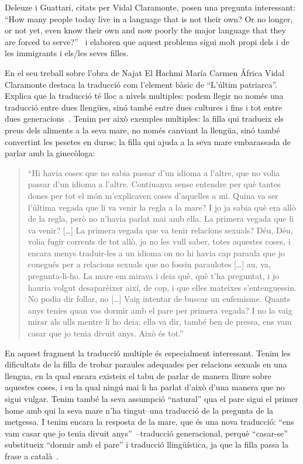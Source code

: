 Deleuze i Guattari, citats per Vidal Claramonte, posen una pregunta interessant:
``How many people today live in a language that is not their own? Or no longer, or not yet, even know their own and now poorly the major language that they are forced to serve?''~\autocite{Vidal2012}
i elaboren que aquest problema sigui molt propi dels i de les immigrants i els/les seves filles.

En el seu treball sobre l'obra de Najat El Hachmi María Carmen África Vidal Claramonte destaca la traducció com l'element bàsic de ``L'últim patriarca''.
Explica que la traducció té lloc a nivels multiples: podem llegir no només una traducció entre dues llengües, sinó també entre dues cultures i fins i tot entre dues generacions~\autocite{Vidal2012}.
Tenim per això exemples multiples:
la filla qui tradueix els preus dels aliments a la seva mare, no només canviant la llengüa, sinó també convertint les pesetes en duros;
la filla qui ajuda a la seva mare embarassada de parlar amb la ginecòloga:
\begin{quote}
``Hi havia coses que no sabia passar d'un idioma a l'altre, que no volia passar d'un idioma a l'altre. Contiuanva sense entendre per què tantes dones per tot el món m'explicaven coses d'aquelles a mi. Quina va ser l'última vegada que li va venir la regla a la mare? I jo ja sabia què era allò de la regla, però no n'havia parlat mai amb ella. La primera vegada que li va venir? [\ldots] La primera vegada que va tenir relacions sexuals? Déu, Déu, volia fugir corrents de tot allò, jo no les vull saber, totes aquestes coses, i encara menys traduir-les a un idioma on no hi havia cap paraula que jo conegués per a relacions sexuals que no fossin paraulotes [\ldots] au, va, pregunta-li-ho. La mare em mirava i deia què, què t'ha preguntat, i jo hauria volgut desaparèixer així, de cop, i que elles mateixes s'entenguessin. No podia dir follar, no [\ldots] Vaig intentar de buscar un eufemisme. Quants anys tenies quan vas dormir amb el pare per primera vegada? I no la vaig mirar als ulls mentre li ho deia; ella va dir, també ben de pressa, ens vam casar que jo tenia divuit anys. Això és tot.''~\autocite[217]{ElHachmi2008}
\end{quote}
En aquest fragment la traducció multiple és especialment interessant.
Tenim les dificultats de la filla de trobar paraules adequades per relacions sexuals en una llengua, en la qual encara existeix el tabu de parlar de manera lliure sobre aquestes coses,
i en la qual ningú mai li ha parlat d'això d'una manera que no sigui vulgar.
Tenim també la seva assumpció ``natural'' qua el pare sigui el primer home amb qui la seva mare n'ha tingut--una traducció de la pregunta de la metgessa.
I tenim encara la resposta de la mare, que és una nova traducció: ``ens vam casar que jo tenia divuit anys''~\autocite[217]{ElHachmi2008}--traducció generacional, perquè ``casar-se'' substitueix ``dormir amb el pare'' i traducció llingüística, ja que la filla passa la frase a català~\autocite{Vidal2012}.

